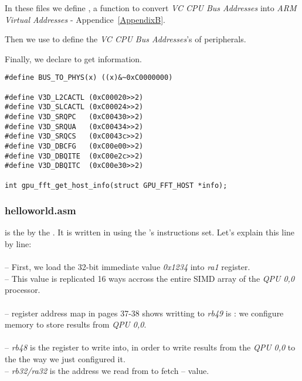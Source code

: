 In these files we define , a  function to convert \emph{VC CPU Bus Addresses} into \emph{ARM Virtual Addresses} - Appendice~\ref{AppendixB}.

Then we use  to define the \emph{VC CPU Bus Addresses}'s of \vc{} peripherals.

Finally, we declare  to get \rasp{} information.

\begin{lstlisting}
#define BUS_TO_PHYS(x) ((x)&~0xC0000000)

#define V3D_L2CACTL (0xC00020>>2)
#define V3D_SLCACTL (0xC00024>>2)
#define V3D_SRQPC   (0xC00430>>2)
#define V3D_SRQUA   (0xC00434>>2)
#define V3D_SRQCS   (0xC0043c>>2)
#define V3D_DBCFG   (0xC00e00>>2)
#define V3D_DBQITE  (0xC00e2c>>2)
#define V3D_DBQITC  (0xC00e30>>2)

int gpu_fft_get_host_info(struct GPU_FFT_HOST *info);
\end{lstlisting}


\subsubsection{helloworld.asm}

 is the  by the \vc. It is written in  using the \vc{}'s instructions set. Let's explain this  line by line:\\

\\
-- First, we load the 32-bit immediate value \emph{0x1234} into \emph{ra1} register.\\
-- This value is replicated 16 ways accross the entire SIMD array of the \emph{QPU 0,0} processor.\\

\\
-- \qpu{} register address map in \parencite{refVC} pages 37-38 shows writting to \emph{rb49} is : we configure  memory to store results from \emph{QPU 0,0}.\\

\\
-- \emph{rb48} is the register to write into, in order to write results from the \emph{QPU 0,0} to the  the way we just configured it.\\
-- \emph{rb32/ra32} is the address we read from to fetch  --  value.\\

